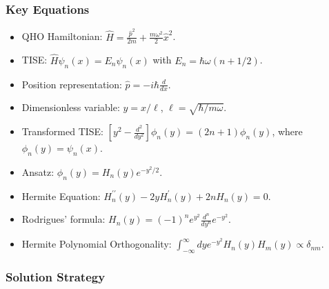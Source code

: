 \documentclass[10pt]{article}
\begin{document}
\subsubsection*{Key Equations}
\begin{itemize}
    \item QHO Hamiltonian: \(\hat{H}=\frac{\hat{p}^{2}}{2 m}+\frac{m \omega^{2}}{2} \hat{x}^{2}\).
    \item TISE: \(\hat{H} \psi_{n}(x)=E_{n} \psi_{n}(x)\) with \(E_n = \hbar\omega(n+1/2)\).
    \item Position representation: \(\hat{p} = -i\hbar\frac{d}{dx}\).
    \item Dimensionless variable: \(y=x/\ell\), \(\ell = \sqrt{\hbar/m\omega}\).
    \item Transformed TISE: \(\left[y^{2}-\frac{d^{2}}{d y^{2}}\right] \phi_{n}(y)=(2 n+1) \phi_{n}(y)\), where \(\phi_n(y) = \psi_n(x)\).
    \item Ansatz: \(\phi_{n}(y)=H_{n}(y) e^{-y^{2} / 2}\).
    \item Hermite Equation: \(H_{n}^{\prime \prime}(y)-2 y H_{n}^{\prime}(y)+2 n H_{n}(y)=0\).
    \item Rodrigues' formula: \(H_{n}(y)=(-1)^{n} e^{y^{2}} \frac{d^{n}}{d y^{n}} e^{-y^{2}}\).
    \item Hermite Polynomial Orthogonality: \(\int_{-\infty}^{\infty} dy e^{-y^{2}} H_{n}(y) H_{m}(y) \propto \delta_{nm}\).
\end{itemize}

\subsubsection*{Solution Strategy}
\end{document}

